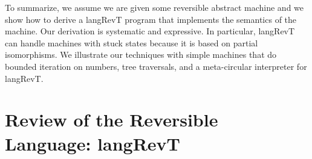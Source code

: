 \documentclass{llncs}
\begin{document}
To summarize, we assume we are given some reversible abstract machine and we
show how to derive a {{langRevT}} program that implements the semantics of
the machine. Our derivation is systematic and expressive. In particular,
{{langRevT}} can handle machines with stuck states because it is based on
partial isomorphisms. We illustrate our techniques with simple machines that
do bounded iteration on numbers, tree traversals, and a meta-circular
interpreter for {{langRevT}}. 




\section{Review of the Reversible Language: {{langRevT}} }
\label{sec:pi}
\end{document}
